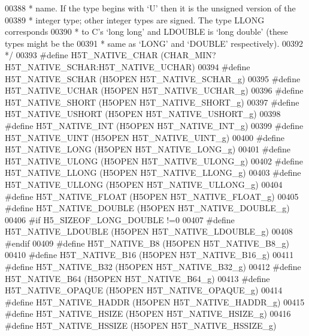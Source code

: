 \begin{DoxyCode}
00388 \textcolor{comment}{ * name.  If the type begins with `U' then it is the unsigned version of the}
00389 \textcolor{comment}{ * integer type; other integer types are signed.  The type LLONG corresponds}
00390 \textcolor{comment}{ * to C's `long long' and LDOUBLE is `long double' (these types might be the}
00391 \textcolor{comment}{ * same as `LONG' and `DOUBLE' respectively).}
00392 \textcolor{comment}{ */}
00393 \textcolor{preprocessor}{#define H5T\_NATIVE\_CHAR     (CHAR\_MIN?H5T\_NATIVE\_SCHAR:H5T\_NATIVE\_UCHAR)}
00394 \textcolor{preprocessor}{#define H5T\_NATIVE\_SCHAR        (H5OPEN H5T\_NATIVE\_SCHAR\_g)}
00395 \textcolor{preprocessor}{#define H5T\_NATIVE\_UCHAR        (H5OPEN H5T\_NATIVE\_UCHAR\_g)}
00396 \textcolor{preprocessor}{#define H5T\_NATIVE\_SHORT        (H5OPEN H5T\_NATIVE\_SHORT\_g)}
00397 \textcolor{preprocessor}{#define H5T\_NATIVE\_USHORT       (H5OPEN H5T\_NATIVE\_USHORT\_g)}
00398 \textcolor{preprocessor}{#define H5T\_NATIVE\_INT          (H5OPEN H5T\_NATIVE\_INT\_g)}
00399 \textcolor{preprocessor}{#define H5T\_NATIVE\_UINT         (H5OPEN H5T\_NATIVE\_UINT\_g)}
00400 \textcolor{preprocessor}{#define H5T\_NATIVE\_LONG         (H5OPEN H5T\_NATIVE\_LONG\_g)}
00401 \textcolor{preprocessor}{#define H5T\_NATIVE\_ULONG        (H5OPEN H5T\_NATIVE\_ULONG\_g)}
00402 \textcolor{preprocessor}{#define H5T\_NATIVE\_LLONG        (H5OPEN H5T\_NATIVE\_LLONG\_g)}
00403 \textcolor{preprocessor}{#define H5T\_NATIVE\_ULLONG       (H5OPEN H5T\_NATIVE\_ULLONG\_g)}
00404 \textcolor{preprocessor}{#define H5T\_NATIVE\_FLOAT        (H5OPEN H5T\_NATIVE\_FLOAT\_g)}
00405 \textcolor{preprocessor}{#define H5T\_NATIVE\_DOUBLE       (H5OPEN H5T\_NATIVE\_DOUBLE\_g)}
00406 \textcolor{preprocessor}{#if H5\_SIZEOF\_LONG\_DOUBLE !=0}
00407 \textcolor{preprocessor}{#define H5T\_NATIVE\_LDOUBLE  (H5OPEN H5T\_NATIVE\_LDOUBLE\_g)}
00408 \textcolor{preprocessor}{#endif}
00409 \textcolor{preprocessor}{#define H5T\_NATIVE\_B8       (H5OPEN H5T\_NATIVE\_B8\_g)}
00410 \textcolor{preprocessor}{#define H5T\_NATIVE\_B16      (H5OPEN H5T\_NATIVE\_B16\_g)}
00411 \textcolor{preprocessor}{#define H5T\_NATIVE\_B32      (H5OPEN H5T\_NATIVE\_B32\_g)}
00412 \textcolor{preprocessor}{#define H5T\_NATIVE\_B64      (H5OPEN H5T\_NATIVE\_B64\_g)}
00413 \textcolor{preprocessor}{#define H5T\_NATIVE\_OPAQUE       (H5OPEN H5T\_NATIVE\_OPAQUE\_g)}
00414 \textcolor{preprocessor}{#define H5T\_NATIVE\_HADDR    (H5OPEN H5T\_NATIVE\_HADDR\_g)}
00415 \textcolor{preprocessor}{#define H5T\_NATIVE\_HSIZE    (H5OPEN H5T\_NATIVE\_HSIZE\_g)}
00416 \textcolor{preprocessor}{#define H5T\_NATIVE\_HSSIZE   (H5OPEN H5T\_NATIVE\_HSSIZE\_g)}

\end{DoxyCode}
